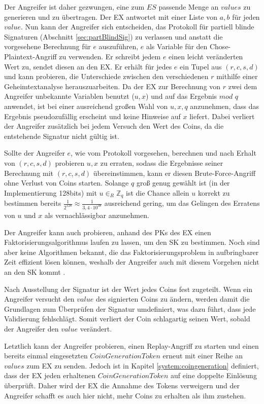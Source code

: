 \documentclass[
	fontsize=11pt,
	headings=small,
	parskip=half,           %
	bibliography=totoc,
	numbers=noenddot,       %
	open=any,               %
]{scrreprt}
\begin{document}
Der Angreifer ist daher gezwungen, eine zum $ES$ passende Menge an $values$ zu generieren und zu übertragen. Der EX antwortet mit einer Liste von $a,b$ für jeden $value$. Nun kann der Angreifer sich entscheiden, das Protokoll für partiell blinde Signaturen (Abschnitt \ref{sec:partBlindSig}) zu verlassen und anstatt die vorgesehene Berechnung für $e$ auszuführen, $e$ als Variable für den Chose-Plaintext-Angriff zu verwenden. Er schreibt jedem $e$ einen leicht veränderten Wert zu, sendet diesen an den EX. Er erhält für jedes $e$ ein Tupel aus $(r,c,s,d)$ und kann probieren, die Unterschiede zwischen den verschiedenen $r$ mithilfe einer Geheimtextanalyse herauszuarbeiten. Da der EX zur Berechnung von $r$ zwei dem Angreifer unbekannte Variablen benutzt ($u,x$) und auf das Ergebnis $mod$ $q$ anwendet, ist bei einer ausreichend großen Wahl von $u,x,q$ anzunehmen, dass das Ergebnis pseudozufällig erscheint und keine Hinweise auf $x$ liefert. Dabei verliert der Angreifer zusätzlich bei jedem Versuch den Wert des Coins, da die entstehende Signatur nicht gültig ist.

Sollte der Angreifer $e$, wie vom Protokoll vorgesehen, berechnen und nach Erhalt von $(r,c,s,d)$ probieren $u,x$ zu erraten, sodass die Ergebnisse seiner Berechnung mit $(r,c,s,d)$ übereinstimmen, kann er diesen Brute-Force-Angriff ohne Verlust von Coins starten. Solange $q$ groß genug gewählt ist (in der Implementierung 128bits) mit $u{\in}_{R} {\mathbb{Z}}_{q}$ ist die Chance allein $u$ korrekt zu bestimmen bereits $\frac{1}{2^{128}} \approx \frac{1}{3,4\cdot10^{38}}$ ausreichend gering, um das Gelingen des Erratens von $u$ und $x$ als vernachlässigbar anzunehmen.

Der Angreifer kann auch probieren, anhand des PKs des EX einen Faktorisierungsalgorithmus laufen zu lassen, um den SK zu bestimmen. Noch sind aber keine Algorithmen bekannt, die das Faktorisierungsproblem in aufbringbarer Zeit effizient lösen können, weshalb der Angreifer auch mit diesem Vorgehen nicht an den SK kommt \cite{montgomery1994survey}.

Nach Ausstellung der Signatur ist der Wert jedes Coins fest zugeteilt. Wenn ein Angreifer versucht den $value$ des signierten Coins zu ändern, werden damit die Grundlagen zum Überprüfen der Signatur umdefiniert, was dazu führt, dass jede Validierung fehlschlägt. Somit verliert der Coin schlagartig seinen Wert, sobald der Angreifer den $value$ verändert.

Letztlich kann der Angreifer probieren, einen Replay-Angriff zu starten und einen bereits einmal eingesetzten $CoinGenerationToken$ erneut mit einer Reihe an $values$ zum EX zu senden. Jedoch ist in Kapitel \ref{system:coingeneration} definiert, dass der EX jeden erhaltenen $CoinGenerationToken$ auf eine doppelte Einlösung überprüft. Daher wird der EX die Annahme des Tokens verweigern und der Angreifer schafft es auch hier nicht, mehr Coins zu erhalten als ihm zustehen.
\end{document}
